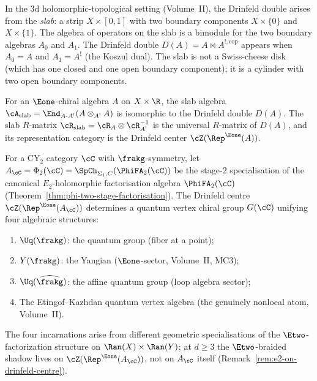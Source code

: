 \begin{remark}
\label{rem:slab-bimodule}
In the 3d holomorphic-topological setting (Volume~II), the
Drinfeld double arises from the \emph{slab}: a strip
$X \times [0,1]$ with two boundary components $X \times \{0\}$
and $X \times \{1\}$. The algebra of operators on the slab
is a bimodule for the two boundary algebras $A_0$ and $A_1$.
The Drinfeld double $D(A) = A \bowtie A^{!,\mathrm{cop}}$
appears when $A_0 = A$ and $A_1 = A^!$ (the Koszul dual).
The slab is not a Swiss-cheese disk (which has one closed
and one open boundary component); it is a cylinder with two
open boundary components.
\end{remark}

\begin{conjecture}[Slab = Drinfeld double]
\label{conj:slab-double}
\ClaimStatusConjectured
For an $\Eone$-chiral algebra $A$ on $X \times \R$, the slab
algebra $\cA_{\mathrm{slab}} = \End_{A\text{-}A^!}(A \otimes_{A^!} A)$
is isomorphic to the Drinfeld double $D(A)$. The slab $R$-matrix
$\cR_{\mathrm{slab}} = \cR_A \otimes \cR_{A^!}^{-1}$ is the
universal $R$-matrix of $D(A)$, and its representation category
is the Drinfeld center $\cZ(\Rep^{\Eone}(A))$.
\end{conjecture}

\begin{conjecture}
\label{conj:qvcg}
\ClaimStatusConjectured
For a CY$_2$ category $\cC$ with $\frakg$-symmetry, let $A_\cC = \Phi_2(\cC) = \SpCh_{\Sigma_1,C}(\PhiFA_2(\cC))$ be the stage-$2$ specialisation of the canonical $E_2$-holomorphic factorisation algebra $\PhiFA_2(\cC)$ (Theorem~\ref{thm:phi-two-stage-factorisation}). The Drinfeld
centre $\cZ(\Rep^{\Eone}(A_\cC))$ determines a quantum vertex
chiral group $G(\cC)$ unifying four algebraic structures:
\begin{enumerate}[label=(\roman*)]
 \item $\Uq(\frakg)$: the quantum group (fiber at a point);
 \item $Y(\frakg)$: the Yangian ($\Eone$-sector, Volume~II, MC3);
 \item $\Uq(\widehat{\frakg})$: the affine quantum group
 (loop algebra sector);
 \item The Etingof--Kazhdan quantum vertex algebra (the genuinely
 nonlocal atom, Volume~II).
\end{enumerate}
The four incarnations arise from different geometric
specialisations of the $\Etwo$-factorization structure on
$\Ran(X) \times \Ran(Y)$; at $d \geq 3$ the $\Etwo$-braided shadow lives on $\cZ(\Rep^{\Eone}(A_\cC))$, not on $A_\cC$ itself (Remark~\ref{rem:e2-on-drinfeld-centre}).
\end{conjecture}

